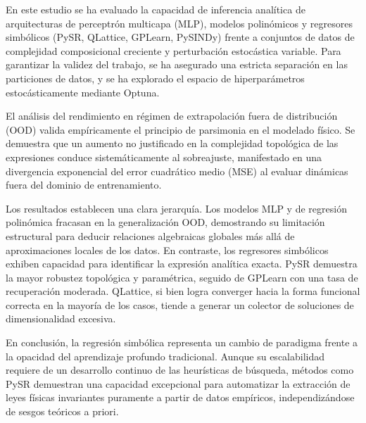 \documentclass[11pt, a4paper]{article}
\begin{document}
En este estudio se ha evaluado la capacidad de inferencia analítica de arquitecturas de perceptrón multicapa (MLP), modelos polinómicos y regresores simbólicos (PySR, QLattice, GPLearn, PySINDy) frente a conjuntos de datos de complejidad composicional creciente y perturbación estocástica variable. Para garantizar la validez del trabajo, se ha asegurado una estricta separación en las particiones de datos, y se ha explorado el espacio de hiperparámetros estocásticamente mediante Optuna.

El análisis del rendimiento en régimen de extrapolación fuera de distribución (OOD) valida empíricamente el principio de parsimonia en el modelado físico. Se demuestra que un aumento no justificado en la complejidad topológica de las expresiones conduce sistemáticamente al sobreajuste, manifestado en una divergencia exponencial del error cuadrático medio (MSE) al evaluar dinámicas fuera del dominio de entrenamiento.

Los resultados establecen una clara jerarquía. Los modelos MLP y de regresión polinómica fracasan en la generalización OOD, demostrando su limitación estructural para deducir relaciones algebraicas globales más allá de aproximaciones locales de los datos. En contraste, los regresores simbólicos exhiben capacidad para identificar la expresión analítica exacta. PySR demuestra la mayor robustez topológica y paramétrica, seguido de GPLearn con una tasa de recuperación moderada. QLattice, si bien logra converger hacia la forma funcional correcta en la mayoría de los casos, tiende a generar un colector de soluciones de dimensionalidad excesiva.

En conclusión, la regresión simbólica representa un cambio de paradigma frente a la opacidad del aprendizaje profundo tradicional. Aunque su escalabilidad requiere de un desarrollo continuo de las heurísticas de búsqueda, métodos como PySR demuestran una capacidad excepcional para automatizar la extracción de leyes físicas invariantes puramente a partir de datos empíricos, independizándose de sesgos teóricos a priori.

\newpage

\end{document}
